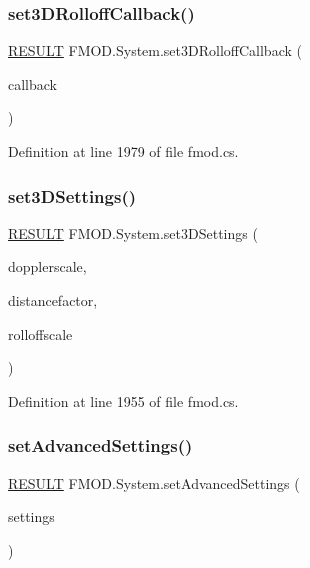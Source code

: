 \subsubsection{\texorpdfstring{set3\+D\+Rolloff\+Callback()}{set3DRolloffCallback()}}
{\footnotesize\ttfamily \hyperlink{namespace_f_m_o_d_a305d1176ef3f8c8815861a60407ac33d}{R\+E\+S\+U\+LT} F\+M\+O\+D.\+System.\+set3\+D\+Rolloff\+Callback (\begin{DoxyParamCaption}\item[{\hyperlink{namespace_f_m_o_d_a6b260b8987f86dc39a7bc6978e080fc3}{C\+B\+\_\+3\+D\+\_\+\+R\+O\+L\+L\+O\+F\+F\+C\+A\+L\+L\+B\+A\+CK}}]{callback }\end{DoxyParamCaption})}



Definition at line 1979 of file fmod.\+cs.

\mbox{\label{class_f_m_o_d_1_1_system_a146005590d491f09f76afa73706a0e92}} 
\subsubsection{\texorpdfstring{set3\+D\+Settings()}{set3DSettings()}}
{\footnotesize\ttfamily \hyperlink{namespace_f_m_o_d_a305d1176ef3f8c8815861a60407ac33d}{R\+E\+S\+U\+LT} F\+M\+O\+D.\+System.\+set3\+D\+Settings (\begin{DoxyParamCaption}\item[{float}]{dopplerscale,  }\item[{float}]{distancefactor,  }\item[{float}]{rolloffscale }\end{DoxyParamCaption})}



Definition at line 1955 of file fmod.\+cs.

\mbox{\label{class_f_m_o_d_1_1_system_a9a655c4aef76f1704cc54cc4ea73ea2d}} 
\subsubsection{\texorpdfstring{set\+Advanced\+Settings()}{setAdvancedSettings()}}
{\footnotesize\ttfamily \hyperlink{namespace_f_m_o_d_a305d1176ef3f8c8815861a60407ac33d}{R\+E\+S\+U\+LT} F\+M\+O\+D.\+System.\+set\+Advanced\+Settings (\begin{DoxyParamCaption}\item[{ref \hyperlink{struct_f_m_o_d_1_1_a_d_v_a_n_c_e_d_s_e_t_t_i_n_g_s}{A\+D\+V\+A\+N\+C\+E\+D\+S\+E\+T\+T\+I\+N\+GS}}]{settings }\end{DoxyParamCaption})}



